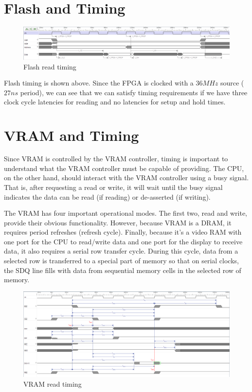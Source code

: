 \section{Flash and Timing}

\begin{figure}[ht!]
    \centering
    \includegraphics[width=6in]{Timing/FPGA-Oscilloscope-ROM-READ.png}
		\caption{Flash read timing}
\end{figure}

Flash timing is shown above. Since the FPGA is clocked with a $36MHz$ source ($27ns$ period), we can see that we can satisfy timing requirements if we have three clock cycle latencies for reading and no latencies for setup and hold times.

\section{VRAM and Timing}

Since VRAM is controlled by the VRAM controller, timing is important to understand what the VRAM controller must be capable of providing. The CPU, on the other hand, should interact with the VRAM controller using a busy signal. That is, after requesting a read or write, it will wait until the busy signal indicates the data can be read (if reading) or de-asserted (if writing).

The VRAM has four important operational modes. The first two, read and write, provide their obvious functionality. However, because VRAM is a DRAM, it requires period refreshes (refresh cycle). Finally, because it's a video RAM with one port for the CPU to read/write data and one port for the display to receive data, it also requires a serial row transfer cycle. During this cycle, data from a selected row is transferred to a special part of memory so that on serial clocks, the SDQ line fills with data from sequential memory cells in the selected row of memory.

\begin{figure}[ht!]
    \centering
    \includegraphics[width=6in]{Timing/FPGA-Oscilloscope-VRAM-READ.png}
		\caption{VRAM read timing}
\end{figure}

